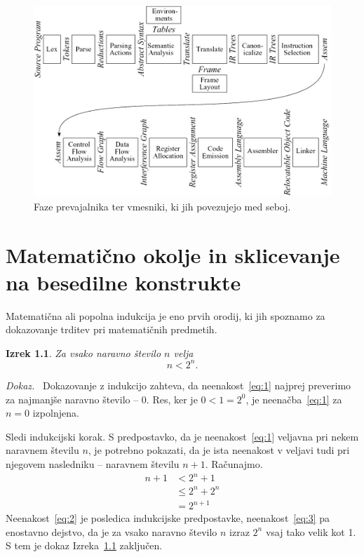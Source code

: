 \documentclass[a4paper, 12pt]{book}
\newtheorem{izrek}{Izrek}[chapter]
\newenvironment{dokaz}{\emph{Dokaz.}\ }{\hspace{\fill}{$\Box$}}
\begin{document}
\begin{figure}[h]
	\begin{center}
		\includegraphics[width=1\textwidth]{resources/compilerPhases.jpg}
	\end{center}
	\caption{Faze prevajalnika ter vmesniki, ki jih povezujejo med seboj.}
	\label{pic1}
\end{figure}

\chapter{Matematično okolje in sklicevanje na besedilne konstrukte}
\label{ch1}



Matematična ali popolna indukcija je eno prvih orodij, ki jih spoznamo za dokazovanje trditev pri matematičnih predmetih.
\begin{izrek}
\label{iz:1}
Za vsako naravno število $n$ velja
\begin{equation}
n < 2^n.
\label{eq:1}
\end{equation}
\end{izrek}
\begin{dokaz}
Dokazovanje z indukcijo zahteva, da neenakost~\eqref{eq:1} najprej preverimo za najmanjše naravno število -- $0$. 
Res, ker je $0 < 1 = 2^0$, je neenačba~\eqref{eq:1} za $n=0$ izpolnjena.

Sledi indukcijski korak. S predpostavko, da je neenakost~\eqref{eq:1} veljavna pri nekem naravnem številu $n$, je potrebno pokazati, da je ista neenakost v veljavi tudi pri njegovem nasledniku -- naravnem številu $n+1$. 
Računajmo.
\begin{align}
n+1 & < 2^n + 1       \label{eq:2}\\
       & \le 2^n + 2^n \label{eq:3}\\
       & = 2^{n+1}       \nonumber
\end{align}
Neenakost~\eqref{eq:2} je posledica indukcijske predpostavke, neenakost~\eqref{eq:3} pa enostavno dejstvo, da je za vsako naravno število $n$ izraz $2^n$ vsaj tako velik kot 1. 
S tem je dokaz Izreka~\ref{iz:1} zaključen.
\end{dokaz}
\end{document}
